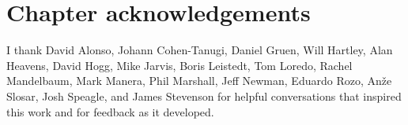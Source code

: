 \section*{Chapter acknowledgements}

I thank David Alonso, Johann Cohen-Tanugi, Daniel Gruen, Will Hartley, Alan Heavens, David Hogg, Mike Jarvis, Boris Leistedt, Tom Loredo, Rachel Mandelbaum, Mark Manera, Phil Marshall, Jeff Newman, Eduardo Rozo, An{\v z}e Slosar, Josh Speagle, and James Stevenson for helpful conversations that inspired this work and for feedback as it developed.

